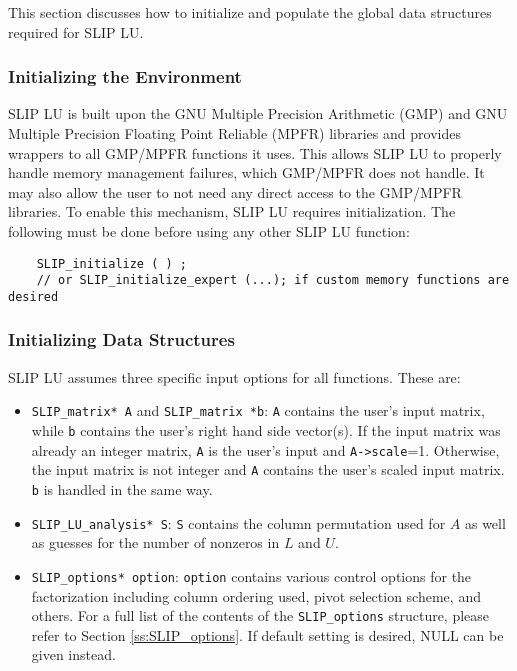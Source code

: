 \documentclass[12pt]{article}
\theoremstyle{definition}
\begin{document}
This section discusses how to initialize and populate the global data
structures required for SLIP LU.

\subsubsection{Initializing the Environment}

SLIP LU is built upon the GNU Multiple Precision Arithmetic (GMP)
\cite{granlund2015gnu} and GNU Multiple Precision Floating Point Reliable
(MPFR) \cite{fousse2007mpfr} libraries and provides
wrappers to all GMP/MPFR functions it uses.
This allows SLIP LU to properly handle
memory management failures, which GMP/MPFR does not handle.
It may also allow the
user to not need any direct access to the GMP/MPFR libraries.  To enable this
mechanism, SLIP LU requires initialization.  The following must be done before
using any other SLIP LU function:


\begin{mdframed}[userdefinedwidth=6in]
{\footnotesize
\begin{verbatim}
    SLIP_initialize ( ) ;
    // or SLIP_initialize_expert (...); if custom memory functions are desired
\end{verbatim}
} \end{mdframed}


\subsubsection{Initializing Data Structures}
\label{ss:init}

SLIP LU assumes three specific input options for all functions. These are:

\begin{itemize}
\item \verb|SLIP_matrix* A| and \verb|SLIP_matrix *b|:
\verb|A| contains the user's input matrix, while \verb|b| contains the user's
right hand side vector(s). If the input matrix was already an integer matrix,
\verb|A| is the user's input and \verb|A->scale|=1. Otherwise, the input matrix is not integer and \verb|A| contains the user's scaled input matrix. \verb|b|
is handled in the same way.

\item \verb|SLIP_LU_analysis* S|: \verb|S| contains the column permutation used
for $A$ as well as guesses for the number of nonzeros in $L$ and $U$.

\item \verb|SLIP_options* option|: \verb|option| contains various control
options for the factorization including column ordering used, pivot selection
scheme, and others. For a full list of the contents of the \verb|SLIP_options|
structure, please refer to Section \ref{ss:SLIP_options}. If default setting
is desired, NULL can be given instead.

\end{itemize}
\end{document}
